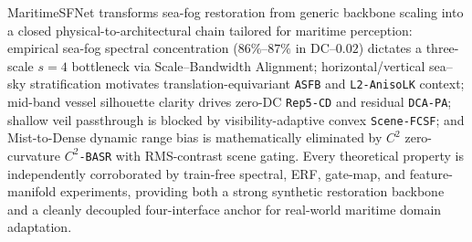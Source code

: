 \documentclass[journal,twoside]{IEEEtran}
\begin{document}
MaritimeSFNet transforms sea-fog restoration from generic backbone scaling into a closed physical-to-architectural chain tailored for maritime perception: empirical sea-fog spectral concentration ($86\%\text{--}87\%$ in $\text{DC}\text{--}0.02$) dictates a three-scale $s=4$ bottleneck via Scale--Bandwidth Alignment; horizontal/vertical sea--sky stratification motivates translation-equivariant \texttt{ASFB} and \texttt{L2-AnisoLK} context; mid-band vessel silhouette clarity drives zero-DC \texttt{Rep5-CD} and residual \texttt{DCA-PA}; shallow veil passthrough is blocked by visibility-adaptive convex \texttt{Scene-FCSF}; and Mist-to-Dense dynamic range bias is mathematically eliminated by $C^2$ zero-curvature \texttt{$C^2$-BASR} with RMS-contrast scene gating. Every theoretical property is independently corroborated by train-free spectral, ERF, gate-map, and feature-manifold experiments, providing both a strong synthetic restoration backbone and a cleanly decoupled four-interface anchor for real-world maritime domain adaptation.

\balance
\end{document}
